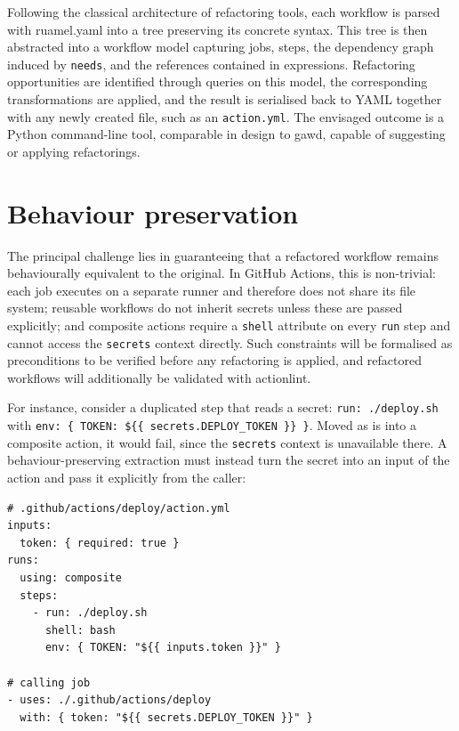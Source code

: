 \documentclass[a4paper,11pt,notitlepage]{report}
\begin{document}
Following the classical architecture of refactoring tools, each workflow is parsed with
ruamel.yaml into a tree preserving its concrete syntax. This tree is then abstracted into a
workflow model capturing jobs, steps, the dependency graph induced by \texttt{needs}, and
the references contained in expressions. Refactoring opportunities are identified through
queries on this model, the corresponding transformations are applied, and the result is
serialised back to YAML together with any newly created file, such as an
\texttt{action.yml}. The envisaged outcome is a Python command-line tool, comparable in
design to gawd, capable of suggesting or applying refactorings.

\section{Behaviour preservation} \label{sec_preservation}

The principal challenge lies in guaranteeing that a refactored workflow remains
behaviourally equivalent to the original. In GitHub Actions, this is non-trivial: each job
executes on a separate runner and therefore does not share its file system; reusable
workflows do not inherit secrets unless these are passed explicitly; and composite actions
require a \texttt{shell} attribute on every \texttt{run} step and cannot access the
\texttt{secrets} context directly. Such constraints will be formalised as preconditions to
be verified before any refactoring is applied, and refactored workflows will additionally
be validated with actionlint.

For instance, consider a duplicated step that reads a secret: \texttt{run:\ ./deploy.sh}
with \texttt{env:\ \{ TOKEN:\ \$\{\{ secrets.DEPLOY\_TOKEN \}\} \}}. Moved as is into a
composite action, it would fail, since the \texttt{secrets} context is unavailable there.
A behaviour-preserving extraction must instead turn the secret into an input of the action
and pass it explicitly from the caller:

\begin{lstlisting}
# .github/actions/deploy/action.yml
inputs:
  token: { required: true }
runs:
  using: composite
  steps:
    - run: ./deploy.sh
      shell: bash
      env: { TOKEN: "${{ inputs.token }}" }

# calling job
- uses: ./.github/actions/deploy
  with: { token: "${{ secrets.DEPLOY_TOKEN }}" }
\end{lstlisting}


\clearpage
{}


\end{document}
